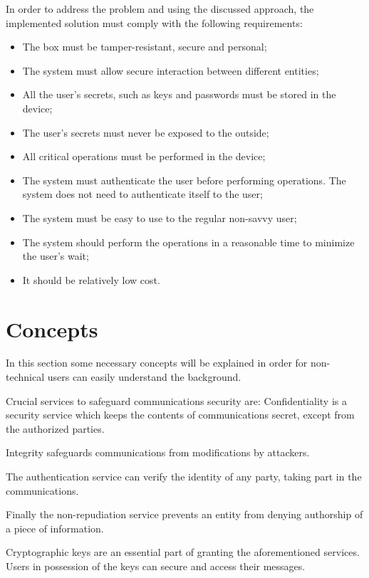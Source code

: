 In order to address the problem and using the discussed approach, the implemented solution must comply with the following requirements:
\begin{itemize}
	\item The box must be tamper-resistant, secure and personal;
	\item The system must allow secure interaction between different entities;
	\item All the user's secrets, such as keys and passwords must be stored in the device;
	\item The user's secrets must never be exposed to the outside;
	\item All critical operations must be performed in the device;
	\item The system must authenticate the user before performing operations. The system does not need to authenticate itself to the user;
	\item The system must be easy to use to the regular non-savvy user;
	\item The system should perform the operations in a reasonable time to minimize the user's wait;
	\item It should be relatively low cost.
\end{itemize}

\section{Concepts} \label{chap:problem:concepts}

In this section some necessary concepts will be explained in order for non-technical users can easily understand the background.

Crucial services to safeguard communications security are:
Confidentiality is a security service which keeps the contents of communications secret, except from the authorized parties.

Integrity safeguards communications from modifications by attackers.

The authentication service can verify the identity of any party, taking part in the communications.

Finally the non-repudiation service prevents an entity from denying authorship of a piece of information.

Cryptographic keys are an essential part of granting the aforementioned services. Users in possession of the keys can secure and access their messages.


